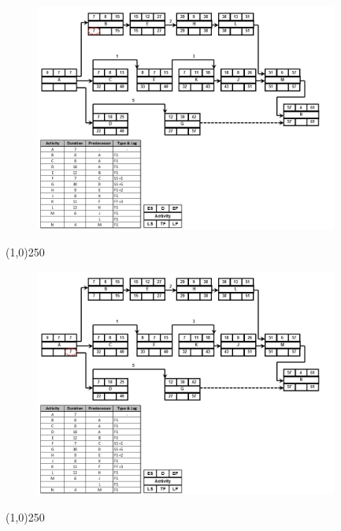\begin{frame}
\begin{figure}
	\centering
		\includegraphics[width = 10.0cm]{oldnotes/Slide236.jpg}
\end{figure}
\end{frame}
\begin{center}\line(1,0){250}\end{center}




\begin{frame}
\begin{figure}
	\centering
		\includegraphics[width = 10.0cm]{oldnotes/Slide237.jpg}
\end{figure}
\end{frame}
\begin{center}\line(1,0){250}\end{center}




